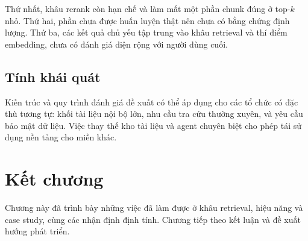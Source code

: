 Thứ nhất, khâu rerank còn hạn chế và làm mất một phần chunk đúng ở top-$k$ nhỏ. Thứ hai,
phần \ft{} chưa được huấn luyện thật nên chưa có bằng chứng định lượng. Thứ ba, các kết quả
chủ yếu tập trung vào khâu retrieval và thí điểm embedding, chưa có đánh giá diện rộng với
người dùng cuối.

\subsection{Tính khái quát}

Kiến trúc và quy trình đánh giá đề xuất có thể áp dụng cho các tổ chức có đặc thù tương
tự: khối tài liệu nội bộ lớn, nhu cầu tra cứu thường xuyên, và yêu cầu bảo mật dữ liệu.
Việc thay thế kho tài liệu và agent chuyên biệt cho phép tái sử dụng nền tảng cho miền
khác.

\section*{Kết chương}
Chương này đã trình bày những việc đã làm được ở khâu retrieval, hiệu năng và case study,
cùng các nhận định định tính. Chương tiếp theo kết luận và đề xuất hướng phát triển.
